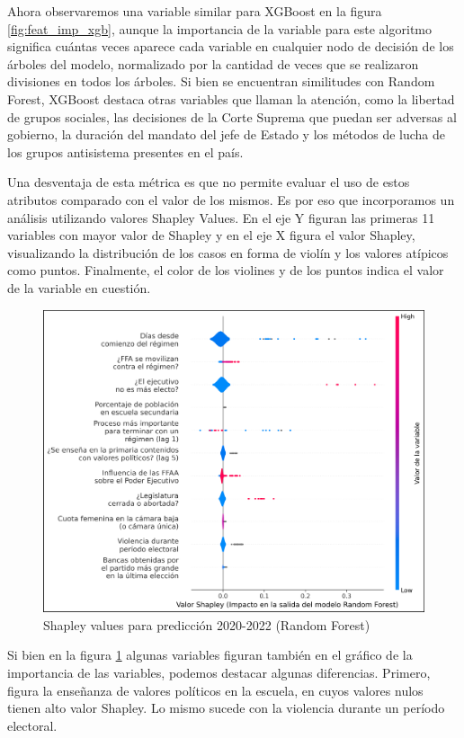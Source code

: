 \documentclass{article}
\begin{document}
Ahora observaremos una variable similar para XGBoost en la figura \ref{fig:feat_imp_xgb}, aunque la 
importancia de la variable para este algoritmo significa cuántas veces aparece cada variable
en cualquier nodo de decisión de los árboles del modelo, normalizado por la cantidad de veces
que se realizaron divisiones en todos los árboles. Si bien se encuentran similitudes con Random Forest,
XGBoost destaca otras variables que llaman la atención, como la libertad de grupos sociales, las 
decisiones de la Corte Suprema que puedan ser adversas al gobierno, la duración del mandato del jefe de 
Estado y los métodos de lucha de los grupos antisistema presentes en el país.

Una desventaja de esta métrica es que no permite evaluar el uso de estos atributos comparado con el valor
de los mismos. Es por eso que incorporamos un análisis utilizando valores Shapley Values. En el eje Y 
figuran las primeras 11 variables con mayor valor de Shapley y en el eje X figura el valor Shapley, 
visualizando la distribución de los casos en forma de violín y los valores atípicos como puntos. Finalmente, 
el color de los violines y de los puntos indica el valor de la variable en cuestión.

\begin{figure}[H]
 \centering
 \includegraphics[width=1\textwidth]{9_shapley_values_rf.png}
 \caption{Shapley values para predicción 2020-2022 (Random Forest)\label{fig:shapley_rf}}
\end{figure}

Si bien en la figura \ref{fig:shapley_rf} algunas variables figuran también en el gráfico de la 
importancia de las variables, podemos destacar algunas diferencias. Primero, figura la enseñanza de 
valores políticos en la escuela, en cuyos valores nulos tienen alto valor Shapley. Lo mismo sucede
con la violencia durante un período electoral.
\end{document}
